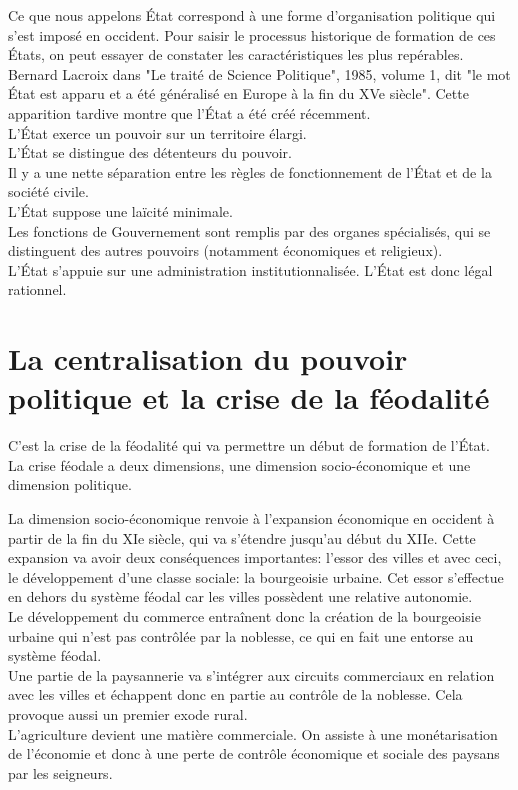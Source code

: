 \documentclass[10pt, a4paper, openany]{book}
\begin{document}
Ce que nous appelons État correspond à une forme d'organisation politique qui s'est imposé en occident. Pour saisir le processus historique de formation de ces États, on peut essayer de constater les caractéristiques les plus repérables. \\
Bernard Lacroix dans "Le traité de Science Politique", 1985, volume 1, dit "le mot État est apparu et a été généralisé en Europe à la fin du XVe siècle". Cette apparition tardive montre que l'État a été créé récemment. \\
L'État exerce un pouvoir sur un territoire élargi. \\
L'État se distingue des détenteurs du pouvoir. \\
Il y a une nette séparation entre les règles de fonctionnement de l'État et de la société civile. \\
L'État suppose une laïcité minimale. \\
Les fonctions de Gouvernement sont remplis par des organes spécialisés, qui se distinguent des autres pouvoirs (notamment économiques et religieux). \\
L'État s'appuie sur une administration institutionnalisée. L'État est donc légal rationnel. 

\section{La centralisation du pouvoir politique et la crise de la féodalité}

C'est la crise de la féodalité qui va permettre un début de formation de l'État. \\
La crise féodale a deux dimensions, une dimension socio-économique et une dimension politique.


La dimension socio-économique renvoie à l'expansion économique en occident à partir de la fin du XIe siècle, qui va s'étendre jusqu'au début du XIIe. Cette expansion va avoir deux conséquences importantes: l'essor des villes et avec ceci, le développement d'une classe sociale: la bourgeoisie urbaine. Cet essor s'effectue en dehors du système féodal car les villes possèdent une relative autonomie. \\
Le développement du commerce entraînent donc la création de la bourgeoisie urbaine qui n'est pas contrôlée par la noblesse, ce qui en fait une entorse au système féodal. \\
Une partie de la paysannerie va s'intégrer aux circuits commerciaux en relation avec les villes et échappent donc en partie au contrôle de la noblesse. Cela provoque aussi un premier exode rural. \\
L'agriculture devient une matière commerciale. On assiste à une monétarisation de l'économie et donc à une perte de contrôle économique et sociale des paysans par les seigneurs. 
\end{document}
